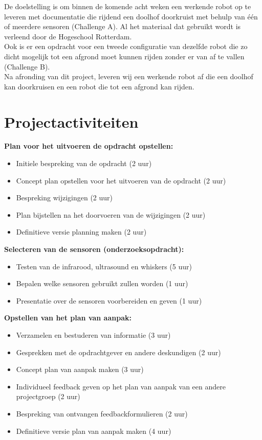 \documentclass[oneside]{book}
\begin{document}
De doelstelling is om binnen de komende acht weken een werkende robot op te leveren met documentatie die rijdend een doolhof doorkruist met behulp van één of meerdere sensoren (Challenge A). 
Al het materiaal dat gebruikt wordt is verleend door de Hogeschool Rotterdam.\\
Ook is er een opdracht voor een tweede configuratie van dezelfde robot die zo dicht mogelijk tot een afgrond moet kunnen rijden zonder er van af te vallen (Challenge B).
\\
Na afronding van dit project, leveren wij een werkende robot af die een doolhof kan doorkruisen en een robot die tot een afgrond kan rijden.
\clearpage
\chapter{Projectactiviteiten}
{\large \textbf{ Plan voor het uitvoeren de opdracht opstellen:}}
\begin{itemize}
\item Initiele bespreking van de opdracht (2 uur)
\item Concept plan opstellen voor het uitvoeren van de opdracht (2 uur)
\item Bespreking wijzigingen (2 uur)
\item Plan bijstellen na het doorvoeren van de wijzigingen (2 uur)
\item Definitieve versie planning maken (2 uur)
\end{itemize}

{\large \textbf{Selecteren van de sensoren (onderzoeksopdracht):}}
\begin{itemize}
\item Testen van de infrarood, ultrasound en whiskers (5 uur)
\item Bepalen welke sensoren gebruikt zullen worden (1 uur)
\item Presentatie over de sensoren voorbereiden en geven (1 uur)
\end{itemize}

{\large \textbf{Opstellen van het plan van aanpak:}}
\begin{itemize}
\item Verzamelen en bestuderen van informatie (3 uur)
\item Gesprekken met de opdrachtgever en andere deskundigen (2 uur)
\item Concept plan van aanpak maken (3 uur)
\item Individueel feedback geven op het plan van aanpak van een andere projectgroep  (2 uur)
\item Bespreking van ontvangen feedbackformulieren (2 uur)
\item Definitieve versie plan van aanpak maken (4 uur)
\end{itemize}
\end{document}
